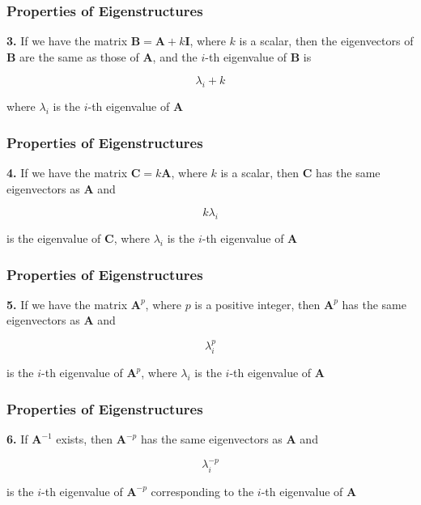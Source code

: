 \documentclass[12pt]{beamer}\usepackage[]{graphicx}\usepackage[]{color}
\begin{document}

\begin{frame}
\frametitle{Properties of Eigenstructures}

{\mdlit \textbf{3.}} If we have the matrix $\mathbf{B} = \mathbf{A} + k \mathbf{I}$, where $k$ is 
a scalar, then the eigenvectors of $\mathbf{B}$ are the same as those of 
$\mathbf{A}$, and the $i$-th eigenvalue of $\mathbf{B}$ is

$$
\lambda_i + k
$$

where $\lambda_i$ is the $i$-th eigenvalue of $\mathbf{A}$

\end{frame}


\begin{frame}
\frametitle{Properties of Eigenstructures}

{\mdlit \textbf{4.}} If we have the matrix $\mathbf{C} = k \mathbf{A}$, where $k$ is a scalar, then
$\mathbf{C}$ has the same eigenvectors as $\mathbf{A}$ and

$$
k \lambda_i
$$

is the eigenvalue of $\mathbf{C}$, where $\lambda_i$ is the $i$-th eigenvalue of 
$\mathbf{A}$

\end{frame}


\begin{frame}
\frametitle{Properties of Eigenstructures}

{\mdlit \textbf{5.}} If we have the matrix $\mathbf{A}^{p}$, where $p$ is a 
positive integer, then $\mathbf{A}^{p}$ has the same 
eigenvectors as $\mathbf{A}$ and

$$
\lambda_{i}^{p}
$$

is the $i$-th eigenvalue of $\mathbf{A}^{p}$, where $\lambda_i$ is the $i$-th 
eigenvalue of $\mathbf{A}$

\end{frame}


\begin{frame}
\frametitle{Properties of Eigenstructures}

{\mdlit \textbf{6.}} If $\mathbf{A}^{-1}$ exists, then $\mathbf{A}^{-p}$ has the same 
eigenvectors as $\mathbf{A}$ and

$$
\lambda_{i}^{-p}
$$

is the $i$-th eigenvalue of $\mathbf{A}^{-p}$ corresponding to the $i$-th 
eigenvalue of $\mathbf{A}$

\end{frame}
\end{document}
